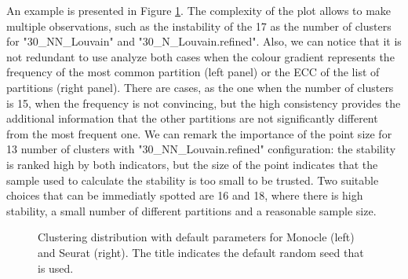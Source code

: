 An example is presented in Figure \ref{fig:ca-1-knpart}. The complexity of the plot allows to make multiple observations, such as the instability of the 17 as the number of clusters for "30\_NN\_Louvain" and "30\_N\_Louvain.refined". Also, we can notice that it is not redundant to use analyze both cases when the colour gradient represents the frequency of the most common partition (left panel) or the ECC of the list of partitions (right panel). There are cases, as the one when the number of clusters is 15, when the frequency is not convincing, but the high consistency provides the additional information that the other partitions are not significantly different from the most frequent one. We can remark the importance of the point size for 13 number of clusters with "30\_NN\_Louvain.refined" configuration: the stability is ranked high by both indicators, but the size of the point indicates that the sample used to calculate the stability is too small to be trusted. Two suitable choices that can be immediatly spotted are 16 and 18, where there is high stability, a small number of different partitions and a reasonable sample size.

\begin{figure}[H]
    \centering
    \caption{\label{fig:ca-1-knpart}Clustering distribution with default parameters for Monocle (left) and Seurat (right). The title indicates the default random seed that is used.}
\end{figure}

